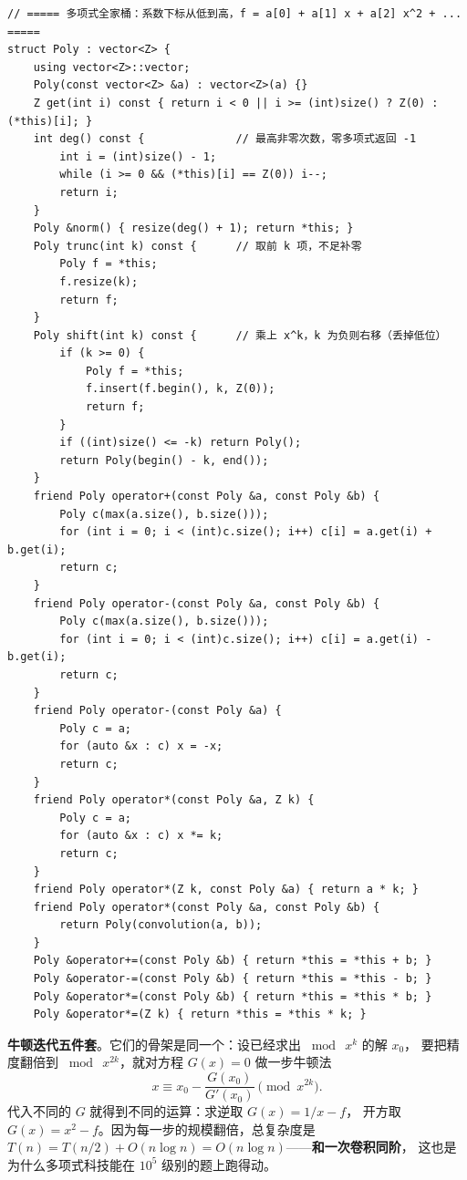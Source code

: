 		\begin{verbatim}
// ===== 多项式全家桶：系数下标从低到高，f = a[0] + a[1] x + a[2] x^2 + ... =====
struct Poly : vector<Z> {
    using vector<Z>::vector;
    Poly(const vector<Z> &a) : vector<Z>(a) {}
    Z get(int i) const { return i < 0 || i >= (int)size() ? Z(0) : (*this)[i]; }
    int deg() const {              // 最高非零次数，零多项式返回 -1
        int i = (int)size() - 1;
        while (i >= 0 && (*this)[i] == Z(0)) i--;
        return i;
    }
    Poly &norm() { resize(deg() + 1); return *this; }
    Poly trunc(int k) const {      // 取前 k 项，不足补零
        Poly f = *this;
        f.resize(k);
        return f;
    }
    Poly shift(int k) const {      // 乘上 x^k，k 为负则右移（丢掉低位）
        if (k >= 0) {
            Poly f = *this;
            f.insert(f.begin(), k, Z(0));
            return f;
        }
        if ((int)size() <= -k) return Poly();
        return Poly(begin() - k, end());
    }
    friend Poly operator+(const Poly &a, const Poly &b) {
        Poly c(max(a.size(), b.size()));
        for (int i = 0; i < (int)c.size(); i++) c[i] = a.get(i) + b.get(i);
        return c;
    }
    friend Poly operator-(const Poly &a, const Poly &b) {
        Poly c(max(a.size(), b.size()));
        for (int i = 0; i < (int)c.size(); i++) c[i] = a.get(i) - b.get(i);
        return c;
    }
    friend Poly operator-(const Poly &a) {
        Poly c = a;
        for (auto &x : c) x = -x;
        return c;
    }
    friend Poly operator*(const Poly &a, Z k) {
        Poly c = a;
        for (auto &x : c) x *= k;
        return c;
    }
    friend Poly operator*(Z k, const Poly &a) { return a * k; }
    friend Poly operator*(const Poly &a, const Poly &b) {
        return Poly(convolution(a, b));
    }
    Poly &operator+=(const Poly &b) { return *this = *this + b; }
    Poly &operator-=(const Poly &b) { return *this = *this - b; }
    Poly &operator*=(const Poly &b) { return *this = *this * b; }
    Poly &operator*=(Z k) { return *this = *this * k; }
		\end{verbatim}

		\textbf{牛顿迭代五件套}。它们的骨架是同一个：设已经求出 $\bmod\ x^k$ 的解 $x_0$，
		要把精度翻倍到 $\bmod\ x^{2k}$，就对方程 $G(x) = 0$ 做一步牛顿法
		$$x \equiv x_0 - \frac{G(x_0)}{G'(x_0)} \pmod{x^{2k}}.$$
		代入不同的 $G$ 就得到不同的运算：求逆取 $G(x) = 1/x - f$，
		开方取 $G(x) = x^2 - f$。因为每一步的规模翻倍，总复杂度是
		$T(n) = T(n/2) + O(n\log n) = O(n\log n)$——\textbf{和一次卷积同阶}，
		这也是为什么多项式科技能在 $10^5$ 级别的题上跑得动。

